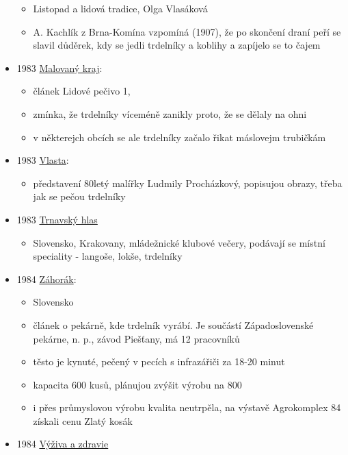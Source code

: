\begin{itemize}
  \begin{itemize}
  \tightlist
  \item
    Listopad a lidová tradice, Olga Vlasáková
  \item
    A. Kachlík z Brna-Komína vzpomíná (1907), že po skončení draní peří
    se slavil důděrek, kdy se jedli trdelníky a koblihy a zapíjelo se to
    čajem
  \end{itemize}
\item
  1983
  \href{https://ndk.cz/uuid/uuid:afab0700-f75c-11e3-8232-5ef3fc9ae867}{Malovaný
  kraj}:

  \begin{itemize}
  \tightlist
  \item
    článek Lidové pečivo 1,
  \item
    zmínka, že trdelníky víceméně zanikly proto, že se dělaly na ohni
  \item
    v některejch obcích se ale trdelníky začalo řikat máslovejm
    trubičkám
  \end{itemize}
\item
  1983
  \href{https://ceskadigitalniknihovna.cz/view/uuid:a3661330-e99a-11e6-9964-005056825209?page=uuid\%3A83054300-e9a3-11e6-8010-005056827e51&fulltext=trdeln\%C3\%ADk\%20OR\%20trdeln\%C3\%ADky\%20OR\%20trdeln\%C3\%ADk\%C5\%AF&source=mzk}{Vlasta}:

  \begin{itemize}
  \tightlist
  \item
    představení 80letý malířky Ludmily Procházkový, popisujou obrazy,
    třeba jak se pečou trdelníky
  \end{itemize}
\item
  1983
  \href{https://dikda.snk.sk/uuid/uuid:b775b7f6-6bff-41ea-81f8-291194dc217c}{Trnavský
  hlas}

  \begin{itemize}
  \tightlist
  \item
    Slovensko, Krakovany, mládežnické klubové večery, podávají se místní
    speciality - langoše, lokše, trdelníky
  \end{itemize}
\item
  1984
  \href{https://dikda.snk.sk/uuid/uuid:f4d70313-b883-466c-972e-3cfd5e07a41e}{Záhorák}:

  \begin{itemize}
  \tightlist
  \item
    Slovensko
  \item
    článek o pekárně, kde trdelník vyrábí. Je součástí Západoslovenské
    pekárne, n. p., závod Piešťany, má 12 pracovníků
  \item
    těsto je kynuté, pečený v pecích s infrazářiči za 18-20 minut
  \item
    kapacita 600 kusů, plánujou zvýšit výrobu na 800
  \item
    i přes průmyslovou výrobu kvalita neutrpěla, na výstavě Agrokomplex
    84 získali cenu Zlatý kosák
  \end{itemize}
\item
  1984
  \href{https://dikda.snk.sk/uuid/uuid:b873200a-106a-429f-b02a-29e45a750c35}{Výživa
  a zdravie}


\end{itemize}
